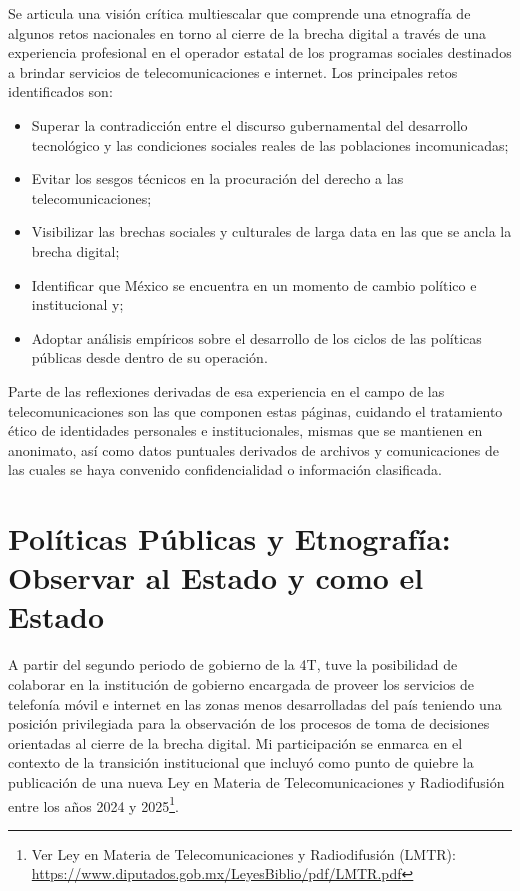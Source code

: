 \documentclass[
  spanish,
  11pt,
  a4paper,
]{scrbook}
\begin{document}
Se articula una visión crítica multiescalar que comprende una etnografía
de algunos retos nacionales en torno al cierre de la brecha digital a
través de una experiencia profesional en el operador estatal de los
programas sociales destinados a brindar servicios de telecomunicaciones
e internet. Los principales retos identificados son:

\begin{itemize}
\item
  Superar la contradicción entre el discurso gubernamental del
  desarrollo tecnológico y las condiciones sociales reales de las
  poblaciones incomunicadas;
\item
  Evitar los sesgos técnicos en la procuración del derecho a las
  telecomunicaciones;
\item
  Visibilizar las brechas sociales y culturales de larga data en las que
  se ancla la brecha digital;
\item
  Identificar que México se encuentra en un momento de cambio político e
  institucional y;
\item
  Adoptar análisis empíricos sobre el desarrollo de los ciclos de las
  políticas públicas desde dentro de su operación.
\end{itemize}

Parte de las reflexiones derivadas de esa experiencia en el campo de las
telecomunicaciones son las que componen estas páginas, cuidando el
tratamiento ético de identidades personales e institucionales, mismas
que se mantienen en anonimato, así como datos puntuales derivados de
archivos y comunicaciones de las cuales se haya convenido
confidencialidad o información clasificada.

\section*{Políticas Públicas y Etnografía: Observar al Estado y como el
Estado}\label{poluxedticas-puxfablicas-y-etnografuxeda-observar-al-estado-y-como-el-estado}


A partir del segundo periodo de gobierno de la 4T, tuve la posibilidad
de colaborar en la institución de gobierno encargada de proveer los
servicios de telefonía móvil e internet en las zonas menos desarrolladas
del país teniendo una posición privilegiada para la observación de los
procesos de toma de decisiones orientadas al cierre de la brecha
digital. Mi participación se enmarca en el contexto de la transición
institucional que incluyó como punto de quiebre la publicación de una
nueva Ley en Materia de Telecomunicaciones y Radiodifusión entre los
años 2024 y 2025\footnote{Ver Ley en Materia de Telecomunicaciones y
  Radiodifusión (LMTR):
  \url{https://www.diputados.gob.mx/LeyesBiblio/pdf/LMTR.pdf}}.
\end{document}
